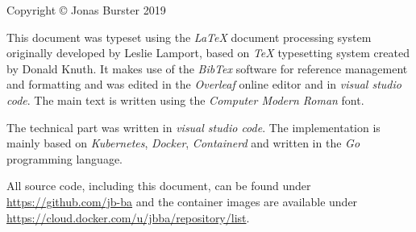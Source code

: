 \thispagestyle{empty}
{\small
\strut\vfill %
\noindent Copyright \copyright{} Jonas Burster 2019\par
\vspace{0.2cm}
\noindent This document was typeset using the \textit{LaTeX} document processing system originally developed by Leslie Lamport, based on \textit{TeX} typesetting system created by Donald Knuth. It makes use of the \textit{BibTex} software for reference management and formatting and was edited in the \textit{Overleaf} online editor and in \textit{visual studio code}. The main text is written using the \textit{Computer Modern Roman} font.\par
\vspace{0.2cm}
\noindent The technical part was written in \textit{visual studio code}. The implementation is mainly based on \textit{Kubernetes}, \textit{Docker}, \textit{Containerd} and written in the \textit{Go} programming language. \par
\vspace{0.2cm}
\noindent All source code, including this document, can be found under \url{https://github.com/jb-ba} and the container images are available under \url{https://cloud.docker.com/u/jbba/repository/list}.\par
\clearpage
}